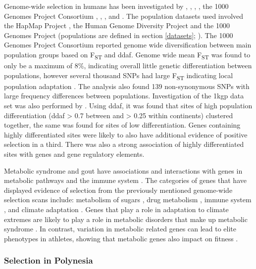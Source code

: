 \documentclass[]{report}
\begin{document}
Genome-wide selection in humans has been investigated by
\citet{sabeti2006positive}, \citet{voight2006map}, \citet{Hancock2008},
\citet{pickrell2009signals}, the 1000 Genomes Project Consortium
\citep{1KGP2010, 1KGP2012, 1KGP2015snp}, \citet{Grossman2010},
\citet{Colonna2014}, and \citet{Mallick2016}. The population datasets
used involved the HapMap Project \citep{Hapmap2005}, the Human Genome
Diversity Project \citep{Cann2002, Rosenburg2002} and the 1000 Genomes
Project (populations are defined in section \ref{datasets};
\citet{1KGP2010}). The 1000 Genomes Project Consortium
\citep{1KGP2010, 1KGP2012, 1KGP2015snp} reported genome wide
diversification between main population groups based on
F\textsubscript{ST} and \gls{ddaf}. Genome wide mean F\textsubscript{ST}
was found to only be a maximum of 8\%, indicating overall little genetic
differentiation between populations, however several thousand SNPs had
large F\textsubscript{ST} indicating local population adaptation
\citep{1KGP2010}. The analysis also found 139 non-synonymous SNPs with
large frequency differences between populations. Investigation of the
\gls{1kgp} data set was also performed by \citet{Colonna2014}. Using
\gls{ddaf}, it was found that sites of high population differentiation
(\gls{ddaf} \textgreater{} 0.7 between and \textgreater{} 0.25 within
continents) clustered together, the same was found for sites of low
differentiation. Genes containing highly differentiated sites were
likely to also have additional evidence of positive selection in a
third. There was also a strong association of highly differentiated
sites with genes and gene regulatory elements.

Metabolic syndrome and gout have associations and interactions with
genes in metabolic pathways and the immune system \citep{Osborn2012}.
The categories of genes that have displayed evidence of selection from
the previously mentioned genome-wide selection scans include: metabolism
of sugars \citep{voight2006map, tang2007new}, drug metabolism
\citep{tang2007new}, immune system \citep{tang2007new, Grossman2010},
and climate adaptation \citep{Hancock2008}. Genes that play a role in
adaptation to climate extremes are likely to play a role in metabolic
disorders that make up metabolic syndrome \citep{Hancock2008}. In
contrast, variation in metabolic related genes can lead to elite
phenotypes in athletes, showing that metabolic genes also impact on
fitness \citep{Ahmetov2009a}.

\subsubsection{Selection in Polynesia}\label{selection-in-polynesia}
\end{document}
